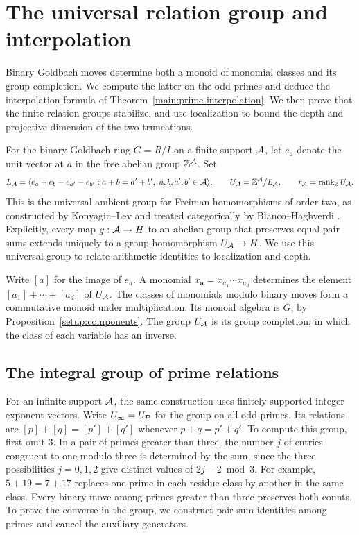 \section{The universal relation group and interpolation}
\label{sec:depth}

Binary Goldbach moves determine both a monoid of monomial classes and
its group completion. We compute the latter on the odd primes and
deduce the interpolation formula of Theorem~\ref{main:prime-interpolation}.
We then prove that the finite relation groups stabilize, and use
localization to bound the depth and projective dimension of the two
truncations.

For the binary Goldbach ring $G=R/I$ on a finite support $\mathcal A$, let
$e_a$ denote the unit vector at $a$ in the free abelian group
$\mathbb Z^{\mathcal A}$. Set
\[
 L_{\mathcal A}=\langle e_a+e_b-e_{a'}-e_{b'}:a+b=a'+b',\ a,b,a',b'\in\mathcal A\rangle,
 \qquad U_{\mathcal A}=\mathbb Z^{\mathcal A}/L_{\mathcal A},
 \qquad r_{\mathcal A}=\operatorname{rank}_{\mathbb Z}U_{\mathcal A}.
\]
This is the universal ambient group for Freiman homomorphisms of
order two, as constructed by Konyagin--Lev \cite{KonyaginLev00}
and treated categorically by Blanco--Haghverdi \cite{BlancoHaghverdi26}.
Explicitly, every map $g:\mathcal A\to H$ to an abelian group that preserves
equal pair sums extends uniquely to a group homomorphism
$U_{\mathcal A}\to H$. We use this universal group to relate arithmetic
identities to localization and depth.

Write $[a]$ for the image of $e_a$. A monomial
$x_{\boldsymbol a}=x_{a_1}\cdots x_{a_d}$ determines the element
$[a_1]+\cdots+[a_d]$ of $U_{\mathcal A}$. The classes of monomials modulo binary moves form a commutative
monoid under multiplication. Its monoid algebra is $G$, by
Proposition~\ref{setup:components}. The group $U_{\mathcal A}$ is
its group completion, in which the class of each variable has an inverse.

\subsection{The integral group of prime relations}

For an infinite support $\mathcal A$, the same construction uses finitely
supported integer exponent vectors. Write $U_\infty=U_{\mathcal P}$ for the
group on all odd primes. Its relations are
$[p]+[q]=[p']+[q']$ whenever $p+q=p'+q'$. To compute
this group, first omit $3$. In a pair of primes greater
than three, the number $j$ of entries congruent to one modulo three
is determined by the sum, since the three possibilities $j=0,1,2$ give
distinct values of $2j-2\bmod3$. For example, $5+19=7+17$ replaces one prime in each residue class
by another in the same class. Every binary move among primes greater
than three preserves both counts. To prove the converse in the group, we construct
pair-sum identities among primes and cancel the auxiliary generators.

